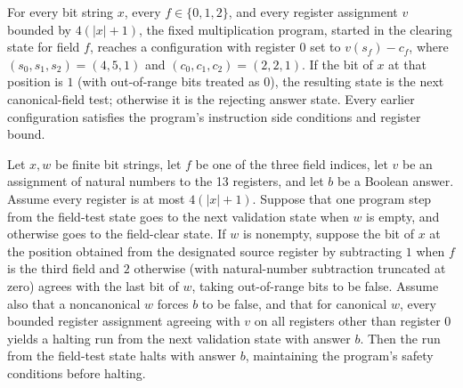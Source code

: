 \begin{lemma}
\label{Complexity.mult_last_bit}
\leanok
{}
For every bit string $x$, every $f\in\{0,1,2\}$, and every register assignment $v$
bounded by $4(|x|+1)$, the fixed multiplication program, started in the clearing state
for field $f$, reaches a configuration with register $0$ set to $v(s_f)-c_f$, where
$(s_0,s_1,s_2)=(4,5,1)$ and $(c_0,c_1,c_2)=(2,2,1)$. If the bit of $x$ at that position
is $1$ (with out-of-range bits treated as $0$), the resulting state is the next
canonical-field test; otherwise it is the rejecting answer state. Every earlier
configuration satisfies the program's instruction side conditions and register bound.
\end{lemma}

\begin{lemma}
\label{Complexity.mult_validate_field}
\leanok
{}
Let $x,w$ be finite bit strings, let $f$ be one of the three field indices, let $v$ be
an assignment of natural numbers to the 13 registers, and let $b$ be a Boolean answer.
Assume every register is at most $4(|x|+1)$. Suppose that one program step from the
field-test state goes to the next validation state when $w$ is empty, and otherwise goes
to the field-clear state. If $w$ is nonempty, suppose the bit of $x$ at the position
obtained from the designated source register by subtracting $1$ when $f$ is the third
field and $2$ otherwise (with natural-number subtraction truncated at zero) agrees with
the last bit of $w$, taking out-of-range bits to be false. Assume also that a
noncanonical $w$ forces $b$ to be false, and that for canonical $w$, every bounded
register assignment agreeing with $v$ on all registers other than register $0$ yields a
halting run from the next validation state with answer $b$. Then the run from the
field-test state halts with answer $b$, maintaining the program’s safety conditions
before halting.
\end{lemma}


